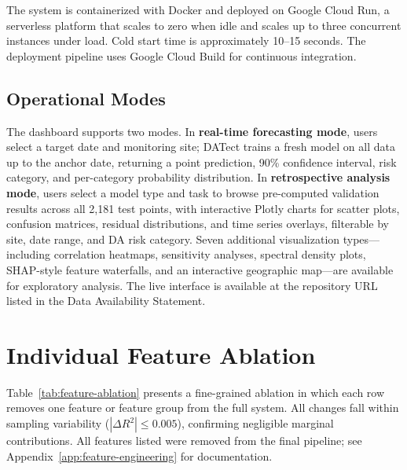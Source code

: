 \documentclass[toxins,article,submit,moreauthors]{Definitions/mdpi}
\begin{document}
The system is containerized with Docker and deployed on Google Cloud Run, a serverless platform that scales to zero when idle and scales up to three concurrent instances under load. Cold start time is approximately 10--15 seconds. The deployment pipeline uses Google Cloud Build for continuous integration.

\subsection*{Operational Modes}

The dashboard supports two modes. In \textbf{real-time forecasting mode}, users select a target date and monitoring site; DATect trains a fresh model on all data up to the anchor date, returning a point prediction, 90\% confidence interval, risk category, and per-category probability distribution. In \textbf{retrospective analysis mode}, users select a model type and task to browse pre-computed validation results across all 2,181 test points, with interactive Plotly charts for scatter plots, confusion matrices, residual distributions, and time series overlays, filterable by site, date range, and DA risk category. Seven additional visualization types---including correlation heatmaps, sensitivity analyses, spectral density plots, SHAP-style feature waterfalls, and an interactive geographic map---are available for exploratory analysis. The live interface is available at the repository URL listed in the Data Availability Statement.


\section{Individual Feature Ablation}
\label{app:feature-ablation}

Table~\ref{tab:feature-ablation} presents a fine-grained ablation in which each row removes one feature or feature group from the full system. All changes fall within sampling variability ($|\Delta R^2| \leq 0.005$), confirming negligible marginal contributions. All features listed were removed from the final pipeline; see Appendix~\ref{app:feature-engineering} for documentation.
\end{document}
